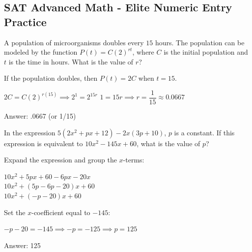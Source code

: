 \documentclass[11pt,paper=a4,answers]{exam}
\begin{document}
\begin{questions}
\pointsinrightmargin
\pointsdroppedatright
\marksnotpoints
{}
\pointformat{\boldmath\themarginpoints}
\bracketedpoints


\section*{SAT Advanced Math - Elite Numeric Entry Practice}

\question
A population of microorganisms doubles every $15$ hours. The population can be modeled by the function $P(t) = C(2)^{rt}$, where $C$ is the initial population and $t$ is the time in hours. What is the value of $r$?

\begin{solution}
If the population doubles, then $P(t) = 2C$ when $t = 15$.
\vspace{5pt}
\begin{center}
$2C = C(2)^{r(15)} \implies 2^1 = 2^{15r}$
\vspace{5pt}
$1 = 15r \implies r = \dfrac{1}{15} \approx 0.0667$
\end{center}
\vspace{5pt}
Answer: \colorbox{yellow!100}{.0667} (or 1/15)
\end{solution}

\vspace{1cm}

\question
In the expression $5(2x^2 + px + 12) - 2x(3p + 10)$, $p$ is a constant. If this expression is equivalent to $10x^2 - 145x + 60$, what is the value of $p$?

\begin{solution}
Expand the expression and group the $x$-terms:
\vspace{5pt}
\begin{center}
$10x^2 + 5px + 60 - 6px - 20x$ \\
$10x^2 + (5p - 6p - 20)x + 60$ \\
$10x^2 + (-p - 20)x + 60$
\end{center}
\vspace{5pt}
Set the $x$-coefficient equal to $-145$:
\vspace{5pt}
\begin{center}
$-p - 20 = -145 \implies -p = -125 \implies p = 125$
\end{center}
\vspace{5pt}
Answer: \colorbox{yellow!100}{125}
\end{solution}


\end{questions}
\end{document}
